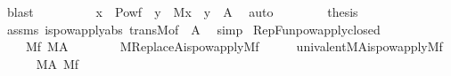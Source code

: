 \begin{isabellebody}
\ blast\isanewline
\ \ \isamarkupfalse%
\isanewline
\ \ \isamarkupfalse%
\ {\isachardoublequoteopen}\ {\isachardot}{\kern0pt}{\isachardot}{\kern0pt}{\isachardot}{\kern0pt}\ {\isacharequal}{\kern0pt}\ {\isacharbraceleft}{\kern0pt}{\isacharbraceleft}{\kern0pt}x\ {\isasymin}\ Pow{\isacharparenleft}{\kern0pt}f\ {\isacharbackquote}{\kern0pt}\ y{\isacharparenright}{\kern0pt}\ {\isachardot}{\kern0pt}\ M{\isacharparenleft}{\kern0pt}x{\isacharparenright}{\kern0pt}{\isacharbraceright}{\kern0pt}\ {\isachardot}{\kern0pt}\ y\ {\isasymin}\ A{\isacharbraceright}{\kern0pt}{\isachardoublequoteclose}\ \isamarkupfalse%
\ auto\isanewline
\ \ \isamarkupfalse%
\ \isanewline
\ \ \isamarkupfalse%
\ {\isacharquery}{\kern0pt}thesis\ \isamarkupfalse%
\ assms\ is{\isacharunderscore}{\kern0pt}powapply{\isacharunderscore}{\kern0pt}abs\ transM{\isacharbrackleft}{\kern0pt}of\ {\isacharunderscore}{\kern0pt}\ A{\isacharbrackright}{\kern0pt}\ \isamarkupfalse%
\ simp\isanewline
{}\isamarkupfalse%
%
\endisatagproof
{\isafoldproof}%
%
\isadelimproof
\isanewline
%
\endisadelimproof
\isanewline
{}\isamarkupfalse%
\ RepFun{\isacharunderscore}{\kern0pt}powapply{\isacharunderscore}{\kern0pt}closed{\isacharcolon}{\kern0pt}\isanewline
\ \ \ \isanewline
\ \ \ \ {\isachardoublequoteopen}M{\isacharparenleft}{\kern0pt}f{\isacharparenright}{\kern0pt}{\isachardoublequoteclose}\ {\isachardoublequoteopen}M{\isacharparenleft}{\kern0pt}A{\isacharparenright}{\kern0pt}{\isachardoublequoteclose}\isanewline
\ \ \ \isanewline
\ \ \ \ {\isachardoublequoteopen}M{\isacharparenleft}{\kern0pt}Replace{\isacharparenleft}{\kern0pt}A{\isacharcomma}{\kern0pt}is{\isacharunderscore}{\kern0pt}powapply{\isacharparenleft}{\kern0pt}M{\isacharcomma}{\kern0pt}f{\isacharparenright}{\kern0pt}{\isacharparenright}{\kern0pt}{\isacharparenright}{\kern0pt}{\isachardoublequoteclose}\isanewline
%
\isadelimproof
%
\endisadelimproof
%
\isatagproof
{}\isamarkupfalse%
\ {\isacharminus}{\kern0pt}\isanewline
\ \ \isamarkupfalse%
\ {\isachardoublequoteopen}univalent{\isacharparenleft}{\kern0pt}M{\isacharcomma}{\kern0pt}A{\isacharcomma}{\kern0pt}is{\isacharunderscore}{\kern0pt}powapply{\isacharparenleft}{\kern0pt}M{\isacharcomma}{\kern0pt}f{\isacharparenright}{\kern0pt}{\isacharparenright}{\kern0pt}{\isachardoublequoteclose}\ \isanewline
\ \ \ \ \isamarkupfalse%
\ {\isacartoucheopen}M{\isacharparenleft}{\kern0pt}A{\isacharparenright}{\kern0pt}{\isacartoucheclose}\ {\isacartoucheopen}M{\isacharparenleft}{\kern0pt}f{\isacharparenright}{\kern0pt}{\isacartoucheclose}\ \isamarkupfalse%

\end{isabellebody}
